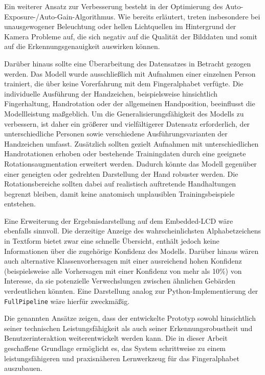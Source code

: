 Ein weiterer Ansatz zur Verbesserung besteht in der Optimierung des Auto-Exposure-/Auto-Gain-Algorithmus. Wie bereits erläutert, treten insbesondere bei unausgewogener Beleuchtung oder hellen Lichtquellen im Hintergrund der Kamera Probleme auf, die sich negativ auf die Qualität der Bilddaten und somit auf die Erkennungsgenauigkeit auswirken können.

Darüber hinaus sollte eine Überarbeitung des Datensatzes in Betracht gezogen werden. Das Modell wurde ausschließlich mit Aufnahmen einer einzelnen Person trainiert, die über keine Vorerfahrung mit dem Fingeralphabet verfügte. Die individuelle Ausführung der Handzeichen, beispielsweise hinsichtlich Fingerhaltung, Handrotation oder der allgemeinen Handposition, beeinflusst die Modellleistung maßgeblich. Um die Generalisierungsfähigkeit des Modells zu verbessern, ist daher ein größerer und vielfältigerer Datensatz erforderlich, der unterschiedliche Personen sowie verschiedene Ausführungsvarianten der Handzeichen umfasst. Zusätzlich sollten gezielt Aufnahmen mit unterschiedlichen Handrotationen erhoben oder bestehende Trainingdaten durch eine geeignete Rotationsaugmentation erweitert werden. Dadurch könnte das Modell gegenüber einer geneigten oder gedrehten Darstellung der Hand robuster werden. Die Rotationsbereiche sollten dabei auf realistisch auftretende Handhaltungen begrenzt bleiben, damit keine anatomisch unplausiblen Trainingsbeispiele entstehen.

Eine Erweiterung der Ergebnisdarstellung auf dem Embedded-LCD wäre ebenfalls sinnvoll. Die derzeitige Anzeige des wahrscheinlichsten Alphabetzeichens in Textform bietet zwar eine schnelle Übersicht, enthält jedoch keine Informationen über die zugehörige Konfidenz des Modells. Darüber hinaus wären auch alternative Klassenvorhersagen mit einer ausreichend hohen Konfidenz (beispielsweise alle Vorhersagen mit einer Konfidenz von mehr als 10\%) von Interesse, da sie potenzielle Verwechslungen zwischen ähnlichen Gebärden verdeutlichen könnten. Eine Darstellung analog zur Python-Implementierung der \texttt{FullPipeline} wäre hierfür zweckmäßig.

Die genannten Ansätze zeigen, dass der entwickelte Prototyp sowohl hinsichtlich seiner technischen Leistungsfähigkeit als auch seiner Erkennungsrobustheit und Benutzerinteraktion weiterentwickelt werden kann. Die in dieser Arbeit geschaffene Grundlage ermöglicht es, das System schrittweise zu einem leistungsfähigeren und praxisnäheren Lernwerkzeug für das Fingeralphabet auszubauen.
